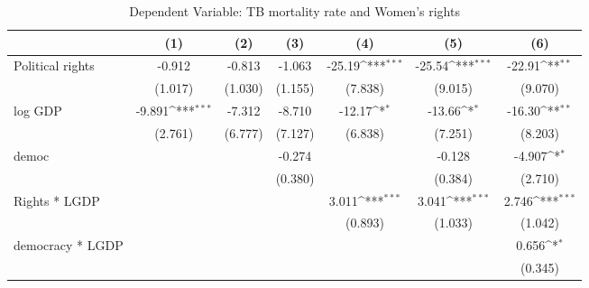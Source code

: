 \documentclass[10pt,letterpaper,subeqn]{beamer}
\begin{document}
\begin{frame}[label=placebo1]
%
\begin{table}[htbp]\centering
\def\sym#1{\ifmmode^{#1}\else\(^{#1}\)\fi}
\scriptsize
\caption{Dependent Variable: TB mortality rate and Women's rights}
\begin{tabular}{l*{6}{c}}
\hline\hline
            &\multicolumn{1}{c}{(1)}&\multicolumn{1}{c}{(2)}&\multicolumn{1}{c}{(3)}&\multicolumn{1}{c}{(4)}&\multicolumn{1}{c}{(5)}&\multicolumn{1}{c}{(6)}\\
\hline
Political rights       &      -0.912         &      -0.813         &      -1.063         &      -25.19\sym{***}&      -25.54\sym{***}&      -22.91\sym{**} \\
            &     (1.017)         &     (1.030)         &     (1.155)         &     (7.838)         &     (9.015)         &     (9.070)         \\

log GDP        &      -9.891\sym{***}&      -7.312         &      -8.710         &      -12.17\sym{*}  &      -13.66\sym{*}  &      -16.30\sym{**} \\
            &     (2.761)         &     (6.777)         &     (7.127)         &     (6.838)         &     (7.251)         &     (8.203)         \\

democ       &                     &                     &      -0.274         &                     &      -0.128         &      -4.907\sym{*}  \\
            &                     &                     &     (0.380)         &                     &     (0.384)         &     (2.710)         \\

Rights * LGDP  &                     &                     &                     &       3.011\sym{***}&       3.041\sym{***}&       2.746\sym{***}\\
            &                     &                     &                     &     (0.893)         &     (1.033)         &     (1.042)         \\

democracy * LGDP   &                     &                     &                     &                     &                     &       0.656\sym{*}  \\
            &                     &                     &                     &                     &                     &     (0.345)         \\


\end{tabular}
\end{table}
\end{frame}
\end{document}
